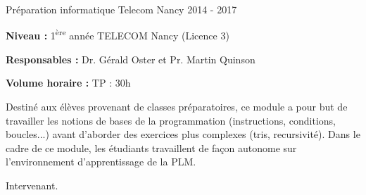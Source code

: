 \documentclass[12pt, a4paper]{awesome-cv}
\begin{document}
\begin{cventries}
  \cventry
  {Préparation informatique} %
  {Telecom Nancy} %
  {} %
  {2014 - 2017} %
  {
    \begin{cvitems}
      \item {\textbf{Niveau : } 1\textsuperscript{ère} année TELECOM Nancy (Licence 3)}
      \item {\textbf{Responsables : } Dr. Gérald Oster et Pr. Martin Quinson}
      \item {\textbf{Volume horaire : } TP : 30h}
    \end{cvitems}
  }

  \begin{cvparagraph}
    Destiné aux élèves provenant de classes préparatoires, ce module a pour but de travailler les notions de bases de la programmation (instructions, conditions, boucles...) avant d'aborder des exercices plus complexes (tris, recursivité).
    Dans le cadre de ce module, les étudiants travaillent de façon autonome sur l'environnement d'apprentissage de la PLM.
  \end{cvparagraph}

  \begin{cvparagraph}
    Intervenant.
  \end{cvparagraph}

\end{cventries}

\end{document}
